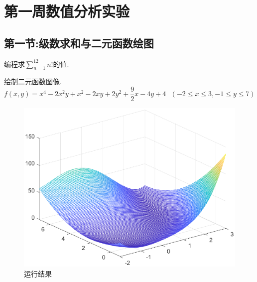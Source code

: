 \section{第一周数值分析实验}
\subsection{第一节:级数求和与二元函数绘图}
\begin{ex}
编程求$\sum_{n=1}^{12}{n!}$的值.
\end{ex}

\begin{ex}
绘制二元函数图像.
$$
f(x,y)=x^4-2x^2y+x^2-2xy+2y^2+\frac{9}{2}x-4y+4\,\,\,\,\left( -2\le x\le 3,-1\le y\le 7 \right) 
$$
\end{ex}

\qa 
\begin{figure}[H]
	\centering
	\includegraphics[width = 0.6\linewidth]{day1/q2.eps}
	\caption{运行结果}
\end{figure}
